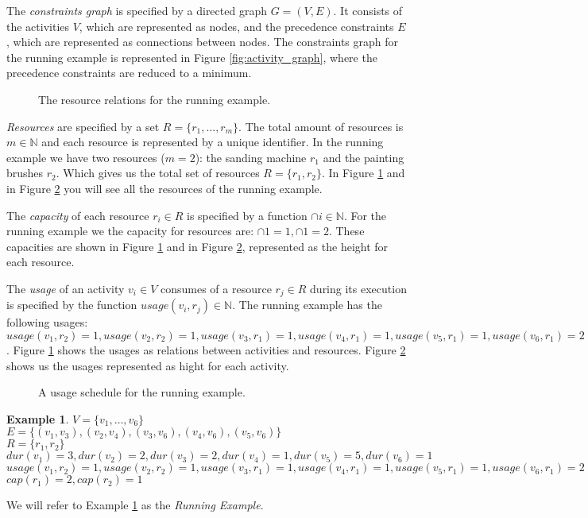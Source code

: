 \documentclass{article}
\theoremstyle{definition}
\newtheorem{example}{Example}[section]
\newcommand{\res}[0]{\ensuremath{R}} %
\newcommand{\capa}[1]{\ensuremath{cap(r_{#1})}} %
\newcommand{\dur}[1]{\ensuremath{dur(v_{#1})}} %
\newcommand{\usage}[2]{\ensuremath{usage(v_{#1}, r_{#2})}} %
\begin{document}
The \emph{constraints graph} is specified by a directed graph $G = (V, E)$.
It consists of the activities $V$, which are represented as nodes, and the precedence constraints $E$, which are represented as connections between nodes.
The constraints graph for the running example is represented in Figure \ref{fig:activity_graph}, where the precedence constraints are reduced to a minimum.

\begin{figure}[h]
	\centering
	
	\caption{The resource relations for the running example. }
	\label{fig:resource_graph}
\end{figure}

\emph{Resources} are specified by a set $R = \{r_1, \ldots, r_m\}$.
The total amount of resources is $m \in \mathbb{N}$ and each resource is represented by a unique identifier. %
In the running example we have two resources ($m = 2$): the sanding machine $r_1$ and the painting brushes $r_2$.
Which gives us the total set of resources $R = \{r_1, r_2\}$.
In Figure \ref{fig:resource_graph} and in Figure \ref{fig:usage_graph} you will see all the resources of the running example.

The \emph{capacity} of each resource $r_i \in R$ is specified by a function $\cap{i} \in \mathbb{N}$.
For the running example we the capacity for resources are: $\cap{1} = 1, \cap{1} = 2$.
These capacities are shown in Figure \ref{fig:resource_graph} and in Figure \ref{fig:usage_graph}, represented as the height for each resource.

The \emph{usage} of an activity $v_i \in V$ consumes of a resource $r_j \in \res$ during its execution is specified by the function $\usage{i}{j} \in \mathbb{N}$.
The running example has the following usages: $\usage{1}{2} = 1, \usage{2}{2} = 1, \usage{3}{1} = 1, \usage{4}{1} = 1, \usage{5}{1} = 1, \usage{6}{1} = 2$.
Figure \ref{fig:resource_graph} shows the usages as relations between activities and resources.
Figure \ref{fig:usage_graph} shows us the usages represented as hight for each activity.

\begin{figure}[h]
	\centering
	
	\caption{A usage schedule for the running example. }
	\label{fig:usage_graph}
\end{figure}

\begin{example}
\label{exmp:running}
$V = \{v_1, \ldots, v_6\}$\\
$E = \{(v_1, v_3), (v_2, v_4), (v_3, v_6), (v_4, v_6), (v_5, v_6)\}$\\
$R = \{r_1, r_2\}$\\
$\dur{1} = 3, \dur{2} = 2, \dur{3} = 2, \dur{4} = 1, \dur{5} = 5, \dur{6} = 1$\\
$\usage{1}{2} = 1, \usage{2}{2} = 1, \usage{3}{1} = 1, \usage{4}{1} = 1, \usage{5}{1} = 1, \usage{6}{1} = 2$\\
$\capa{1} = 2, \capa{2} = 1$
\end{example}
We will refer to Example \ref{exmp:running} as the \emph{Running Example}.
\end{document}
